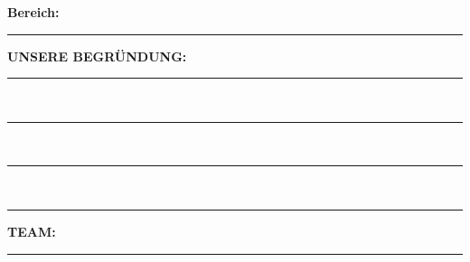 \documentclass[12pt, a4paper]{article}
\begin{document}
\begin{center}
{\begin{minipage}{0.45\textwidth}
                \vspace{0.5cm}
                
                \textbf{Bereich:} \rule{0.7\linewidth}{0.4pt}
                
                \vspace{0.5cm}
                
                \textbf{UNSERE BEGRÜNDUNG:}\\
                \rule{\linewidth}{0.4pt}\\
                \rule{\linewidth}{0.4pt}\\
                \rule{\linewidth}{0.4pt}\\
                \rule{\linewidth}{0.4pt}
                
                \vspace{0.5cm}
                
                \textbf{TEAM:} \rule{0.8\linewidth}{0.4pt}
            \end{minipage}%
        }
    \end{center}

    \vspace{1cm}
\end{document}
